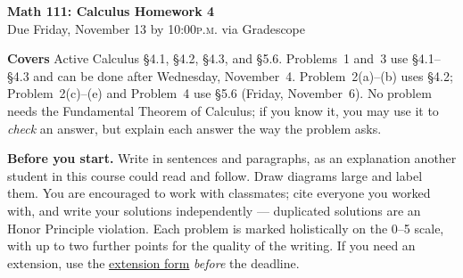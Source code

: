 \documentclass[11pt]{article}
\begin{document}
\begin{center}
{\Large\bfseries Math 111: Calculus \quad Homework 4}\\[4pt]
{Due Friday, November 13 by 10:00\textsc{p.m.} via Gradescope}
\end{center}

\medskip
\noindent\textbf{Covers} Active Calculus \S4.1, \S4.2, \S4.3, and \S5.6. Problems~1 and~3
use \S4.1--\S4.3 and can be done after Wednesday, November~4. Problem~2(a)--(b) uses
\S4.2; Problem~2(c)--(e) and Problem~4 use \S5.6 (Friday, November~6). No problem needs
the Fundamental Theorem of Calculus; if you know it, you may use it to \emph{check} an
answer, but explain each answer the way the problem asks.

\smallskip
\noindent\textbf{Before you start.} Write in sentences and paragraphs, as an
explanation another student in this course could read and follow. Draw diagrams large
and label them. You are encouraged to work with classmates; cite everyone you worked
with, and write your solutions independently --- duplicated solutions are an Honor
Principle violation. Each problem is marked holistically on the 0--5 scale, with up
to two further points for the quality of the writing. If you need an extension, use
the \href{https://docs.google.com/forms/d/e/1FAIpQLSfIfgx44SFtUzefTNr-80yz35MVJaUqQttt96xVTU5mCQCOgg/viewform}{extension
form} \emph{before} the deadline.
\end{document}
